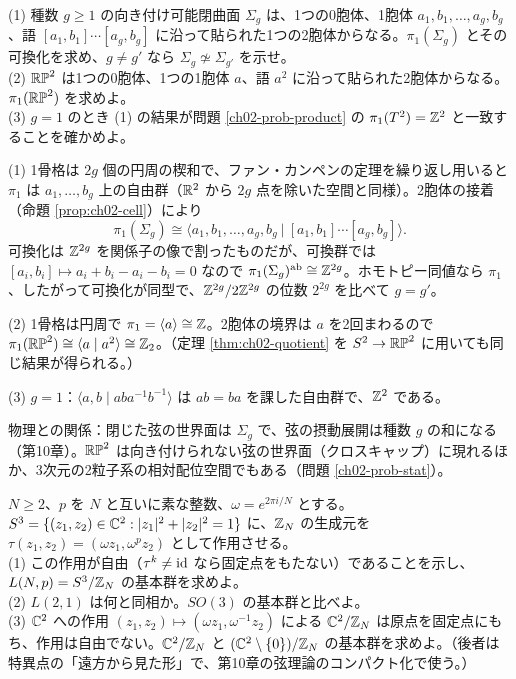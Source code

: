 \begin{problem}[難易度 B]\label{ch02-prob-surface}
(1) 種数 $g\ge1$ の向き付け可能閉曲面 $\Sigma_g$ は、1つの0胞体、1胞体 $a_1,b_1,\dots,a_g,b_g$、語 $[a_1,b_1]\cdots[a_g,b_g]$ に沿って貼られた1つの2胞体からなる。$\pi_1(\Sigma_g)$ とその可換化を求め、$g\ne g'$ なら $\Sigma_g\not\simeq\Sigma_{g'}$ を示せ。\\
(2) $\mathbb{RP}^2$ は1つの0胞体、1つの1胞体 $a$、語 $a^2$ に沿って貼られた2胞体からなる。$\pi_1(\mathbb{RP}^2)$ を求めよ。\\
(3) $g=1$ のとき (1) の結果が問題 \ref{ch02-prob-product} の $\pi_1(T^2)=\mathbb{Z}^2$ と一致することを確かめよ。
\end{problem}

\begin{solution}
(1) 1骨格は $2g$ 個の円周の楔和で、ファン・カンペンの定理を繰り返し用いると $\pi_1$ は $a_1,\dots,b_g$ 上の自由群（$\mathbb{R}^2$ から $2g$ 点を除いた空間と同様）。2胞体の接着（命題 \ref{prop:ch02-cell}）により
\[
\pi_1(\Sigma_g)\cong\bigl\langle a_1,b_1,\dots,a_g,b_g\ \big|\ [a_1,b_1]\cdots[a_g,b_g]\bigr\rangle .
\]
可換化は $\mathbb{Z}^{2g}$ を関係子の像で割ったものだが、可換群では $[a_i,b_i]\mapsto a_i+b_i-a_i-b_i=0$ なので $\pi_1(\Sigma_g)^{\mathrm{ab}}\cong\mathbb{Z}^{2g}$。ホモトピー同値なら $\pi_1$、したがって可換化が同型で、$\mathbb{Z}^{2g}/2\mathbb{Z}^{2g}$ の位数 $2^{2g}$ を比べて $g=g'$。

(2) 1骨格は円周で $\pi_1=\langle a\rangle\cong\mathbb{Z}$。2胞体の境界は $a$ を2回まわるので $\pi_1(\mathbb{RP}^2)\cong\langle a\mid a^2\rangle\cong\mathbb{Z}_2$。（定理 \ref{thm:ch02-quotient} を $S^2\to\mathbb{RP}^2$ に用いても同じ結果が得られる。）

(3) $g=1$：$\langle a,b\mid aba^{-1}b^{-1}\rangle$ は $ab=ba$ を課した自由群で、$\mathbb{Z}^2$ である。

物理との関係：閉じた弦の世界面は $\Sigma_g$ で、弦の摂動展開は種数 $g$ の和になる（第10章）。$\mathbb{RP}^2$ は向き付けられない弦の世界面（クロスキャップ）に現れるほか、3次元の2粒子系の相対配位空間でもある（問題 \ref{ch02-prob-stat}）。
\end{solution}

\begin{problem}[難易度 C]\label{ch02-prob-lens}
$N\ge2$、$p$ を $N$ と互いに素な整数、$\omega=e^{2\pi i/N}$ とする。$S^3=\{(z_1,z_2)\in\mathbb{C}^2:\lvert z_1\rvert^2+\lvert z_2\rvert^2=1\}$ に、$\mathbb{Z}_N$ の生成元を $\tau(z_1,z_2)=(\omega z_1,\omega^pz_2)$ として作用させる。\\
(1) この作用が自由（$\tau^k\ne\mathrm{id}$ なら固定点をもたない）であることを示し、 $L(N,p)=S^3/\mathbb{Z}_N$ の基本群を求めよ。\\
(2) $L(2,1)$ は何と同相か。$SO(3)$ の基本群と比べよ。\\
(3) $\mathbb{C}^2$ への作用 $(z_1,z_2)\mapsto(\omega z_1,\omega^{-1}z_2)$ による $\mathbb{C}^2/\mathbb{Z}_N$ は原点を固定点にもち、作用は自由でない。$\mathbb{C}^2/\mathbb{Z}_N$ と $(\mathbb{C}^2\setminus\{0\})/\mathbb{Z}_N$ の基本群を求めよ。（後者は特異点の「遠方から見た形」で、第10章の弦理論のコンパクト化で使う。）
\end{problem}


